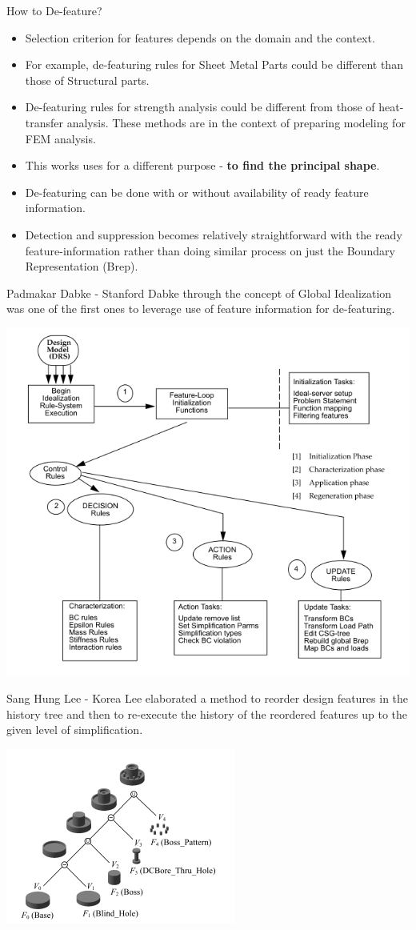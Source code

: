 \begin{frame}{How to De-feature?}
\begin{itemize}[noitemsep,label=\textbullet,topsep=2pt,parsep=2pt,partopsep=2pt]
\item Selection criterion for features depends on the domain and the context. 
\item For example, de-featuring rules for Sheet Metal Parts could be different than those of Structural parts. 
\item De-featuring rules for strength analysis could be different from those of heat-transfer analysis. These methods are in the context of preparing modeling for FEM analysis. 
\item This works uses for a different purpose - \textbf{to find the principal shape}.
\item De-featuring can be done with or without availability of ready feature information.
\item Detection and suppression becomes relatively straightforward with the ready feature-information rather than doing similar process on just the Boundary Representation (Brep).  
\end{itemize}
\end{frame}

\begin{frame}{Padmakar Dabke - Stanford}
Dabke \cite{Dabke1994} through the concept of Global Idealization was one of the first ones to leverage use of feature information for de-featuring. 

\includegraphics[width=0.5\linewidth]{..//Common/images/DefeaturingDabke.png}
\end{frame}


\begin{frame}{Sang Hung Lee - Korea}
Lee \cite{Lee2005} elaborated a method to reorder design features in the history tree and then to re-execute the history of the reordered features up to the given level of simplification. 

\includegraphics[width=0.5\linewidth]{..//Common/images/DefeaturingSHLeeSmall.png}

\end{frame}


